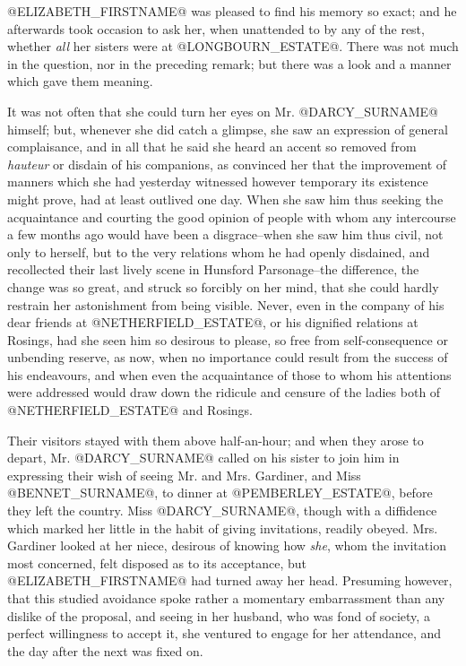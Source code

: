 @ELIZABETH_FIRSTNAME@ was pleased to find his memory so exact; and he afterwards
took occasion to ask her, when unattended to by any of the rest, whether
\textit{all} her sisters were at @LONGBOURN_ESTATE@. There was not much in the question,
nor in the preceding remark; but there was a look and a manner which
gave them meaning.

It was not often that she could turn her eyes on Mr. @DARCY_SURNAME@ himself;
but, whenever she did catch a glimpse, she saw an expression of general
complaisance, and in all that he said she heard an accent so removed
from \textit{hauteur} or disdain of his companions, as convinced her that
the improvement of manners which she had yesterday witnessed however
temporary its existence might prove, had at least outlived one day. When
she saw him thus seeking the acquaintance and courting the good opinion
of people with whom any intercourse a few months ago would have been a
disgrace--when she saw him thus civil, not only to herself, but to the
very relations whom he had openly disdained, and recollected their last
lively scene in Hunsford Parsonage--the difference, the change was
so great, and struck so forcibly on her mind, that she could hardly
restrain her astonishment from being visible. Never, even in the company
of his dear friends at @NETHERFIELD_ESTATE@, or his dignified relations
at Rosings, had she seen him so desirous to please, so free from
self-consequence or unbending reserve, as now, when no importance
could result from the success of his endeavours, and when even the
acquaintance of those to whom his attentions were addressed would draw
down the ridicule and censure of the ladies both of @NETHERFIELD_ESTATE@ and
Rosings.

Their visitors stayed with them above half-an-hour; and when they arose
to depart, Mr. @DARCY_SURNAME@ called on his sister to join him in expressing
their wish of seeing Mr. and Mrs. Gardiner, and Miss @BENNET_SURNAME@, to dinner
at @PEMBERLEY_ESTATE@, before they left the country. Miss @DARCY_SURNAME@, though with a
diffidence which marked her little in the habit of giving invitations,
readily obeyed. Mrs. Gardiner looked at her niece, desirous of knowing
how \textit{she}, whom the invitation most concerned, felt disposed as to its
acceptance, but @ELIZABETH_FIRSTNAME@ had turned away her head. Presuming however,
that this studied avoidance spoke rather a momentary embarrassment than
any dislike of the proposal, and seeing in her husband, who was fond of
society, a perfect willingness to accept it, she ventured to engage for
her attendance, and the day after the next was fixed on.

